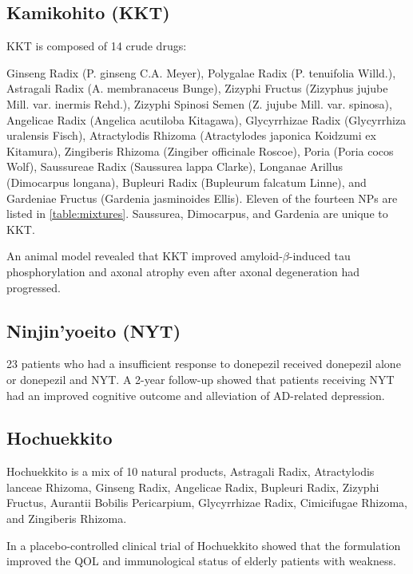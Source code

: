 \documentclass[twocolumn]{article}
\begin{document}
\subsection{Kamikohito (KKT)}
KKT is composed of 14 crude drugs:

Ginseng Radix (P. ginseng C.A. Meyer),
Polygalae Radix (P. tenuifolia Willd.),
Astragali Radix (A. membranaceus Bunge),
Zizyphi Fructus (Zizyphus jujube Mill. var. inermis Rehd.),
Zizyphi Spinosi Semen (Z. jujube Mill. var. spinosa),
Angelicae Radix (Angelica acutiloba Kitagawa),
Glycyrrhizae Radix (Glycyrrhiza uralensis Fisch),
Atractylodis Rhizoma (Atractylodes japonica Koidzumi ex Kitamura),
Zingiberis Rhizoma (Zingiber officinale Roscoe),
Poria (Poria cocos Wolf),
Saussureae Radix (Saussurea lappa Clarke),
Longanae Arillus (Dimocarpus longana),
Bupleuri Radix (Bupleurum falcatum Linne), and
Gardeniae Fructus (Gardenia jasminoides Ellis).
Eleven of the fourteen NPs are listed in \ref{table:mixtures}.
Saussurea, Dimocarpus, and Gardenia are unique to KKT.

An animal model revealed that KKT
improved amyloid-$\beta$-induced tau phosphorylation and axonal atrophy
even after axonal degeneration had progressed.
\cite{watari2014new, watari2015comparing}



\subsection{Ninjin'yoeito (NYT)}


23 patients who had a insufficient response to donepezil
received donepezil alone or donepezil and NYT.
A 2-year follow-up showed that patients receiving NYT
had an improved cognitive outcome and alleviation of AD-related depression.
\cite{kudoh2015effect}





\subsection{Hochuekkito}
Hochuekkito is a mix of 10 natural products,
Astragali Radix,
Atractylodis lanceae Rhizoma,
Ginseng Radix,
Angelicae Radix,
Bupleuri Radix,
Zizyphi Fructus,
Aurantii Bobilis Pericarpium,
Glycyrrhizae Radix,
Cimicifugae Rhizoma,
and Zingiberis Rhizoma.
\cite{kiyohara2011polysaccharide}

In a placebo-controlled clinical trial of Hochuekkito
showed that the formulation improved the QOL and immunological status
of elderly patients with weakness.
\cite{satoh2005randomized}
\end{document}
